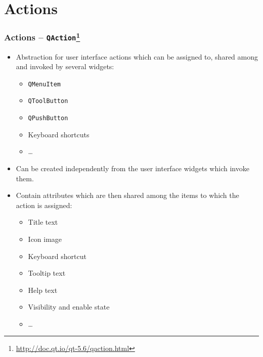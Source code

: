 \section{Actions}

\begin{frame}
  \frametitle{Actions -- \texttt{QAction}\footnote
    {\url{http://doc.qt.io/qt-5.6/qaction.html}}}
  \footnotesize
  \begin{itemize}
    \item Abstraction for user interface actions which can be assigned to,
      shared among and invoked by several widgets:
      \begin{itemize}
        \scriptsize
        \item \texttt{QMenuItem}
        \item \texttt{QToolButton}
        \item \texttt{QPushButton}
        \item Keyboard shortcuts
        \item \ldots
      \end{itemize}
    \item Can be created independently from the user interface widgets 
      which invoke them.
    \item Contain attributes which are then shared among the items to which the
      action is assigned:
      \begin{itemize}
        \scriptsize
        \item Title text
        \item Icon image
        \item Keyboard shortcut
        \item Tooltip text
        \item Help text
        \item Visibility and enable state
        \item \ldots
      \end{itemize}
  \end{itemize}
\end{frame}


